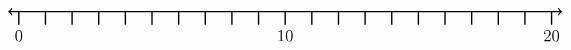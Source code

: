 \documentclass[leqno, 12pt]{article}
\begin{document}
\vspace{10pt}\begin{equation}
    \begin{tikzpicture}[scale=0.67, baseline={([yshift=-1pt]current bounding box.north)}]
        \draw[{To[scale=1.3]}-{To[scale=1.3]}, line width=1pt] (-0.4, 0) -- (20.4, 0);
        \foreach \x in {0,1,...,20}
            \draw[shift={(\x,0)},color=black, line width=1pt] (0pt,-14pt) -- (0pt,0pt);
        \foreach \x in {0,10,20}
            \draw[shift={(\x,-0.8)},color=black] node[font=\large,text height=12pt] {$\x$};
        \node [font=\large, anchor=east] at (25,1.65) {$  $};
    \end{tikzpicture}
\end{equation}
\vspace{10pt}
\end{document}
